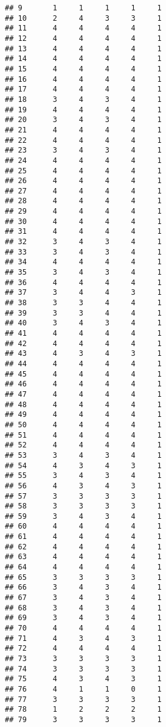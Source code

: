 \documentclass[
]{article}
\begin{document}
\begin{verbatim}
## 9       1     1     1     1     1
## 10      2     4     3     3     1
## 11      4     4     4     4     1
## 12      4     4     4     4     1
## 13      4     4     4     4     1
## 14      4     4     4     4     1
## 15      4     4     4     4     1
## 16      4     4     4     4     1
## 17      4     4     4     4     1
## 18      3     4     3     4     1
## 19      4     4     4     4     1
## 20      3     4     3     4     1
## 21      4     4     4     4     1
## 22      4     4     4     4     1
## 23      3     4     3     4     1
## 24      4     4     4     4     1
## 25      4     4     4     4     1
## 26      4     4     4     4     1
## 27      4     4     4     4     1
## 28      4     4     4     4     1
## 29      4     4     4     4     1
## 30      4     4     4     4     1
## 31      4     4     4     4     1
## 32      3     4     3     4     1
## 33      3     4     3     4     1
## 34      4     4     4     4     1
## 35      3     4     3     4     1
## 36      4     4     4     4     1
## 37      3     4     4     3     1
## 38      3     3     4     4     1
## 39      3     3     4     4     1
## 40      3     4     3     4     1
## 41      4     4     4     4     1
## 42      4     4     4     4     1
## 43      4     3     4     3     1
## 44      4     4     4     4     1
## 45      4     4     4     4     1
## 46      4     4     4     4     1
## 47      4     4     4     4     1
## 48      4     4     4     4     1
## 49      4     4     4     4     1
## 50      4     4     4     4     1
## 51      4     4     4     4     1
## 52      4     4     4     4     1
## 53      3     4     3     4     1
## 54      4     3     4     3     1
## 55      3     4     3     4     1
## 56      4     3     4     3     1
## 57      3     3     3     3     1
## 58      3     3     3     3     1
## 59      3     4     3     4     1
## 60      4     4     4     4     1
## 61      4     4     4     4     1
## 62      4     4     4     4     1
## 63      4     4     4     4     1
## 64      4     4     4     4     1
## 65      3     3     3     3     1
## 66      3     4     3     4     1
## 67      3     4     3     4     1
## 68      3     4     3     4     1
## 69      3     4     3     4     1
## 70      4     4     4     4     1
## 71      4     3     4     3     1
## 72      4     4     4     4     1
## 73      3     3     3     3     1
## 74      3     3     3     3     1
## 75      4     3     4     3     1
## 76      4     1     1     0     1
## 77      3     3     3     3     1
## 78      1     2     2     2     1
## 79      3     3     3     3     1

\end{verbatim}
\end{document}
